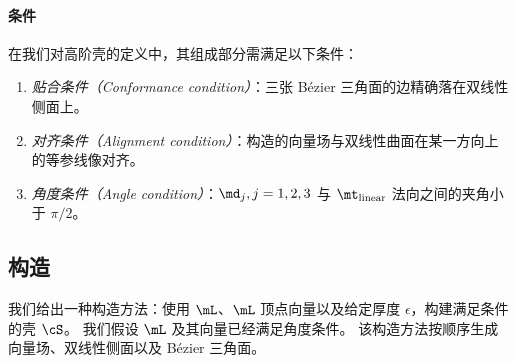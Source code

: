\paragraph{条件}
在我们对高阶壳的定义中，其组成部分需满足以下条件：
\begin{enumerate}
    \item \emph{贴合条件（Conformance condition）}：三张 B\'{e}zier 三角面的边精确落在双线性侧面上。
    \item \emph{对齐条件（Alignment condition）}：构造的向量场与双线性曲面在某一方向上的等参线像对齐。
    \item \emph{角度条件（Angle condition）}：$\md_j, j=1,2,3$ 与 $\mt_{\text{linear}}$ 法向之间的夹角小于 $\pi/2$。
\end{enumerate}






\subsection{构造}\label{sec:construct-from-L}
我们给出一种构造方法：使用 $\mL$、$\mL$ 顶点向量以及给定厚度 $\epsilon$，构建满足条件的壳 $\cS$。
我们假设 $\mL$ 及其向量已经满足角度条件。
该构造方法按顺序生成向量场、双线性侧面以及 B\'{e}zier 三角面。

